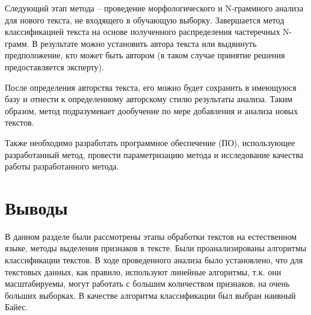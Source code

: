Следующий этап метода – проведение морфологического и N-граммного анализа для нового текста, не входящего в обучающую выборку. Завершается метод классификацией текста на основе полученного распределения частеречных N-грамм. В результате можно установить автора текста или выдвинуть предположение, кто может быть автором (в таком случае принятие решения предоставляется эксперту).

После определения авторства текста, его можно будет сохранить в имеющуюся базу и отнести к определенному авторскому стилю результаты анализа. Таким образом, метод подразумевает дообучение по мере добавления и анализа новых текстов.

Также необходимо разработать программное обеспечение (ПО), использующее разработанный метод, провести параметризацию метода и исследование качества работы разработанного метода.


\section{Выводы}

В данном разделе были рассмотрены этапы обработки текстов на естественном языке, методы выделения признаков в тексте. Были проанализированы алгоритмы классификации текстов. В ходе проведенного анализа было установлено, что для текстовых данных, как правило, используют линейные алгоритмы, т.к. они масштабируемы, могут работать с большим количеством признаков, на очень больших выборках. В качестве алгоритма классификации был выбран наивный Байес.